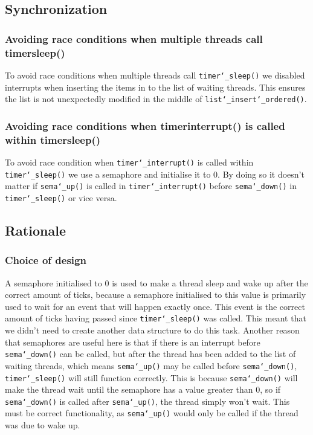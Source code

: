 \documentclass{article}
\renewcommand{\_}{\char`_}
\begin{document}
\subsection{Synchronization}
\subsubsection{Avoiding race conditions when multiple threads call timer\textunderscore sleep()}
To avoid race conditions when multiple threads call \texttt{timer\_sleep()} we disabled interrupts when inserting the items in 
to the list of waiting threads. This ensures the list is not unexpectedly modified in the middle of \texttt{list\_insert\_ordered()}.
\subsubsection{Avoiding race conditions when timer\textunderscore interrupt() is called within timer\textunderscore sleep()}
To avoid race condition when \texttt{timer\_interrupt()} is called within \texttt{timer\_sleep()} we use a semaphore and initialise it to 0. By doing so it doesn't matter if \texttt{sema\_up()} is called in \texttt{timer\_interrupt()} before \texttt{sema\_down()} in \texttt{timer\_sleep()} or vice versa.

\subsection{Rationale}

\subsubsection{Choice of design}

A semaphore initialised to 0 is used to make a thread sleep and wake up after the correct amount of ticks, because a semaphore initialised to this value is primarily used to wait for an event that will happen exactly once. This event is the correct amount of ticks having passed since \texttt{timer\_sleep()} was called. This meant that we didn't need to create another data structure to do this task. Another reason that semaphores are useful here is that if there is an interrupt before \texttt{sema\_down()} can be called, but after the thread has been added to the list of waiting threads, which means \texttt{sema\_up()} may be called before \texttt{sema\_down()}, \texttt{timer\_sleep()} will still function correctly. This is because \texttt{sema\_down()} will make the thread wait until the semaphore has a value greater than 0, so if \texttt{sema\_down()} is called after \texttt{sema\_up()}, the thread simply won't wait. This must be correct functionality, as \texttt{sema\_up()} would only be called if the thread was due to wake up.
\end{document}
